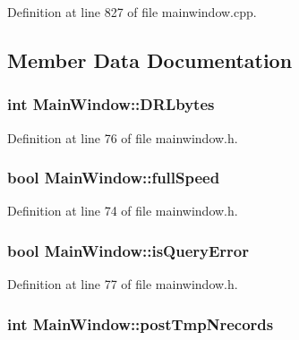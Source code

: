 \-Definition at line 827 of file mainwindow.\-cpp.



\subsection{\-Member \-Data \-Documentation}
\hypertarget{classMainWindow_af648bf6238ec163343b5dec5e900fc23}{
\subsubsection[{\-D\-R\-Lbytes}]{\setlength{\rightskip}{0pt plus 5cm}int {\bf \-Main\-Window\-::\-D\-R\-Lbytes}}}\label{classMainWindow_af648bf6238ec163343b5dec5e900fc23}


\-Definition at line 76 of file mainwindow.\-h.

\hypertarget{classMainWindow_ac3f3016f1a0ad93767c521c2fd349c7b}{
\subsubsection[{full\-Speed}]{\setlength{\rightskip}{0pt plus 5cm}bool {\bf \-Main\-Window\-::full\-Speed}}}\label{classMainWindow_ac3f3016f1a0ad93767c521c2fd349c7b}


\-Definition at line 74 of file mainwindow.\-h.

\hypertarget{classMainWindow_a88b9fd4866e9ab0c99f50c7c0801e8de}{
\subsubsection[{is\-Query\-Error}]{\setlength{\rightskip}{0pt plus 5cm}bool {\bf \-Main\-Window\-::is\-Query\-Error}}}\label{classMainWindow_a88b9fd4866e9ab0c99f50c7c0801e8de}


\-Definition at line 77 of file mainwindow.\-h.

\hypertarget{classMainWindow_a271013fd9b8f471aed5ce6ff2941a6cf}{
\subsubsection[{post\-Tmp\-Nrecords}]{\setlength{\rightskip}{0pt plus 5cm}int {\bf \-Main\-Window\-::post\-Tmp\-Nrecords}}}\label{classMainWindow_a271013fd9b8f471aed5ce6ff2941a6cf}


